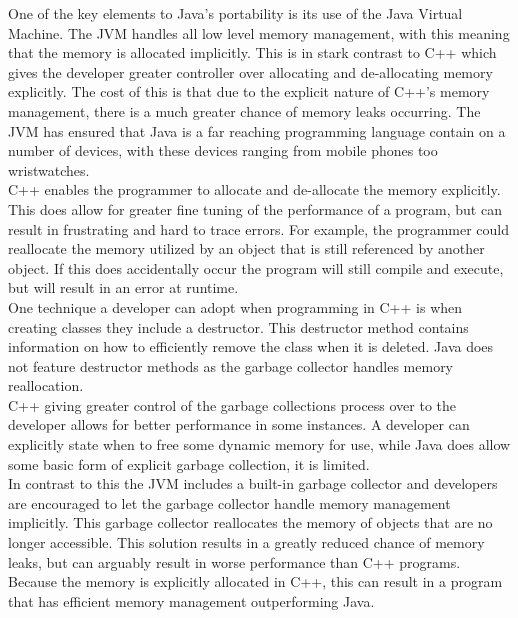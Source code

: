 \documentclass[10pt]{article}  %
\theoremstyle{definition}
\theoremstyle{remark}
\begin{document}
One of the key elements to Java's portability is its use of the Java Virtual Machine. The JVM handles all low level memory management, with this meaning that the memory is allocated implicitly. This is in stark contrast to C++ which gives the developer greater controller over allocating and de-allocating memory explicitly. The cost of this is that due to the explicit nature of C++'s memory management, there is a much greater chance of memory leaks occurring. The JVM has ensured that Java is a far reaching programming language contain on a number of devices, with these devices ranging from mobile phones too wristwatches.\\

C++ enables the programmer to allocate and de-allocate the memory explicitly. This does allow for greater fine tuning of the performance of a program, but can result in frustrating and hard to trace errors. For example, the programmer could reallocate the memory utilized by an object that is still referenced by another object.  If this does accidentally occur the program will still compile and execute, but will result in an error at runtime.\\

One technique a developer can adopt when programming in C++ is when creating classes they include a destructor. This destructor method contains information on how to efficiently remove the class when it is deleted. Java does not feature destructor methods as the garbage collector handles memory reallocation.\\

C++ giving greater control of the garbage collections process over to the developer allows for better performance in some instances. A developer can explicitly state when to free some dynamic memory for use, while Java does allow some basic form of explicit garbage collection, it is limited. \\

In contrast to this the JVM includes a built-in garbage collector and developers are encouraged to let the garbage collector handle memory management implicitly. This garbage collector reallocates the memory of objects that are no longer accessible. This solution results in a greatly reduced chance of memory leaks, but can arguably result in worse performance than C++ programs. Because the memory is explicitly allocated in C++, this can result in a program that has efficient memory management outperforming Java.\\
\end{document}
